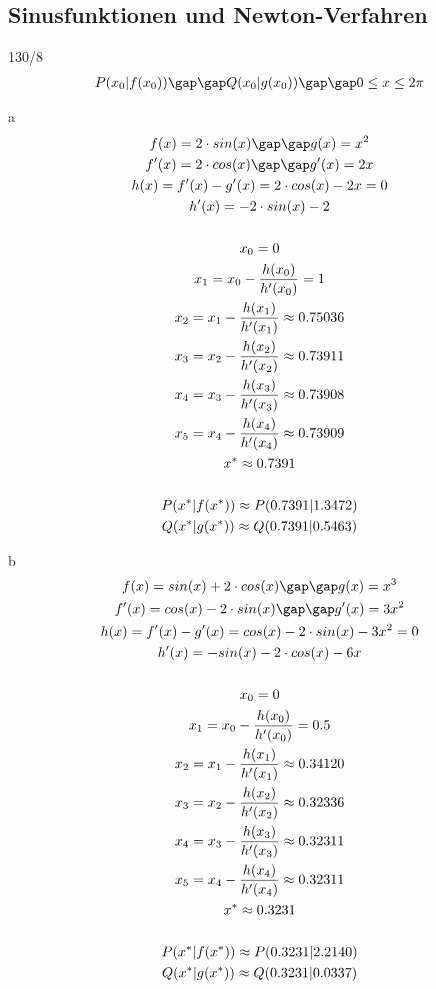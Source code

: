 \subsection{Sinusfunktionen und Newton-Verfahren}
\begin{exercise}{130/8}
  \begin{gather*}
    P(x_0|f(x_0)) \gap\gap Q(x_0|g(x_0)) \gap\gap 0 \leq x \leq 2\pi
  \end{gather*}
  \item [a]
  \begin{gather*}
    f(x) = 2 \cdot sin(x) \gap\gap g(x) = x^2 \\
    f'(x) = 2 \cdot cos(x) \gap\gap g'(x) = 2x \\
    h(x) = f'(x) - g'(x) = 2 \cdot cos(x) - 2x = 0 \\
    h'(x) = -2 \cdot sin(x) - 2 \\\\
    x_0 = 0 \\
    x_1 = x_0 - \frac{h(x_0)}{h'(x_0)} = 1 \\
    x_2 = x_1 - \frac{h(x_1)}{h'(x_1)} \approx 0.75036 \\
    x_3 = x_2 - \frac{h(x_2)}{h'(x_2)} \approx 0.73911 \\
    x_4 = x_3 - \frac{h(x_3)}{h'(x_3)} \approx 0.73908 \\
    x_5 = x_4 - \frac{h(x_4)}{h'(x_4)} \approx 0.73909 \\
    x^\ast \approx 0.7391 \\\\
    P(x^\ast|f(x^\ast)) \approx P(0.7391|1.3472) \\
    Q(x^\ast|g(x^\ast)) \approx Q(0.7391|0.5463)
  \end{gather*}
  \item [b]
  \begin{gather*}
    f(x) = sin(x) + 2 \cdot cos(x) \gap\gap g(x) = x^3 \\
    f'(x) = cos(x) - 2 \cdot sin(x) \gap\gap g'(x) = 3x^2 \\
    h(x) = f'(x) - g'(x) = cos(x) - 2 \cdot sin(x) - 3x^2 = 0 \\
    h'(x) = -sin(x) - 2 \cdot cos(x) - 6x \\\\
    x_0 = 0 \\
    x_1 = x_0 - \frac{h(x_0)}{h'(x_0)} = 0.5 \\
    x_2 = x_1 - \frac{h(x_1)}{h'(x_1)} \approx 0.34120 \\
    x_3 = x_2 - \frac{h(x_2)}{h'(x_2)} \approx 0.32336 \\
    x_4 = x_3 - \frac{h(x_3)}{h'(x_3)} \approx 0.32311 \\
    x_5 = x_4 - \frac{h(x_4)}{h'(x_4)} \approx 0.32311 \\
    x^\ast \approx 0.3231 \\\\
    P(x^\ast|f(x^\ast)) \approx P(0.3231|2.2140) \\
    Q(x^\ast|g(x^\ast)) \approx Q(0.3231|0.0337)
  \end{gather*}
\end{exercise}
